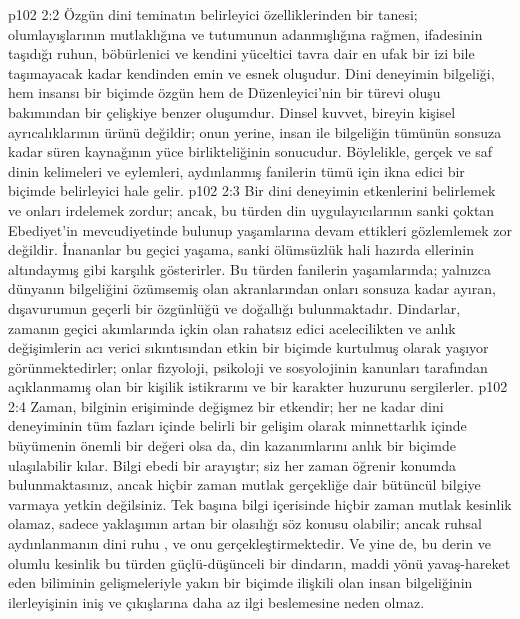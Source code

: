 \vs p102 2:2 Özgün dini teminatın belirleyici özelliklerinden bir tanesi; olumlayışlarının mutlaklığına ve tutumunun adanmışlığına rağmen, ifadesinin taşıdığı ruhun, böbürlenici ve kendini yüceltici tavra dair en ufak bir izi bile taşımayacak kadar kendinden emin ve esnek oluşudur. Dini deneyimin bilgeliği, hem insansı bir biçimde özgün hem de Düzenleyici’nin bir türevi oluşu bakımından bir çelişkiye benzer oluşumdur. Dinsel kuvvet, bireyin kişisel ayrıcalıklarının ürünü değildir; onun yerine, insan ile bilgeliğin tümünün sonsuza kadar süren kaynağının yüce birlikteliğinin sonucudur. Böylelikle, gerçek ve saf dinin kelimeleri ve eylemleri, aydınlanmış fanilerin tümü için ikna edici bir biçimde belirleyici hale gelir.
\vs p102 2:3 Bir dini deneyimin etkenlerini belirlemek ve onları irdelemek zordur; ancak, bu türden din uygulayıcılarının sanki çoktan Ebediyet’in mevcudiyetinde bulunup yaşamlarına devam ettikleri gözlemlemek zor değildir. İnananlar bu geçici yaşama, sanki ölümsüzlük hali hazırda ellerinin altındaymış gibi karşılık gösterirler. Bu türden fanilerin yaşamlarında; yalnızca dünyanın bilgeliğini özümsemiş olan akranlarından onları sonsuza kadar ayıran, dışavurumun geçerli bir özgünlüğü ve doğallığı bulunmaktadır. Dindarlar, zamanın geçici akımlarında içkin olan rahatsız edici acelecilikten ve anlık değişimlerin acı verici sıkıntısından etkin bir biçimde kurtulmuş olarak yaşıyor görünmektedirler; onlar fizyoloji, psikoloji ve sosyolojinin kanunları tarafından açıklanmamış olan bir kişilik istikrarını ve bir karakter huzurunu sergilerler.
\vs p102 2:4 Zaman, bilginin erişiminde değişmez bir etkendir; her ne kadar dini deneyiminin tüm fazları içinde belirli bir gelişim olarak minnettarlık içinde büyümenin önemli bir değeri olsa da, din kazanımlarını anlık bir biçimde ulaşılabilir kılar. Bilgi ebedi bir arayıştır; siz her zaman öğrenir konumda bulunmaktasınız, ancak hiçbir zaman mutlak gerçekliğe dair bütüncül bilgiye varmaya yetkin değilsiniz. Tek başına bilgi içerisinde hiçbir zaman mutlak kesinlik olamaz, sadece yaklaşımın artan bir olasılığı söz konusu olabilir; ancak ruhsal aydınlanmanın dini ruhu , ve onu  gerçekleştirmektedir. Ve yine de, bu derin ve olumlu kesinlik bu türden güçlü\hyp{}düşünceli bir dindarın, maddi yönü yavaş\hyp{}hareket eden biliminin gelişmeleriyle yakın bir biçimde ilişkili olan insan bilgeliğinin ilerleyişinin iniş ve çıkışlarına daha az ilgi beslemesine neden olmaz.
